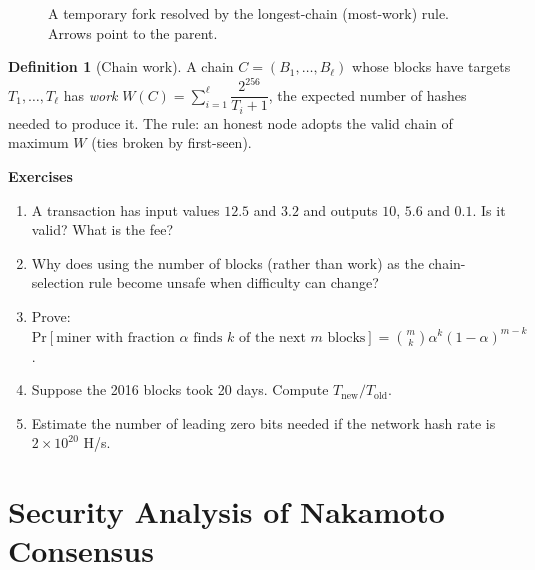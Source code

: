 \documentclass[11pt,a4paper]{article}
\newenvironment{formal}{\par\smallskip}{\par\smallskip}
\newenvironment{exercisebox}{\par\medskip\noindent\textbf{Exercises}\par\nopagebreak\smallskip}{\par\medskip}
\theoremstyle{definition}
\newtheorem{definition}{Definition}[section]
\theoremstyle{plain}
\theoremstyle{remark}
\renewcommand{\Pr}{\mathrm{Pr}}
\begin{document}
\begin{figure}[htbp]
\centering
{}
\caption{A temporary fork resolved by the longest-chain (most-work) rule. Arrows point to the parent.}
\end{figure}

\begin{formal}
\begin{definition}[Chain work]
A chain $C=(B_1,\dots,B_\ell)$ whose blocks have targets $T_1,\dots,T_\ell$ has \emph{work} $W(C)=\sum_{i=1}^\ell \dfrac{2^{256}}{T_i+1}$, the expected number of hashes needed to produce it.
The rule: an honest node adopts the valid chain of maximum $W$ (ties broken by first-seen).
\end{definition}
\end{formal}

\begin{exercisebox}
\begin{enumerate}[nosep]
\item A transaction has input values $12.5$ and $3.2$ and outputs $10$, $5.6$ and $0.1$. Is it valid? What is the fee?
\item Why does using the number of blocks (rather than work) as the chain-selection rule become unsafe when difficulty can change?
\item Prove: $\Pr[\text{miner with fraction }\alpha\text{ finds }k\text{ of the next }m\text{ blocks}]=\binom mk\alpha^k(1-\alpha)^{m-k}$.
\item Suppose the 2016 blocks took 20 days. Compute $T_{\text{new}}/T_{\text{old}}$.
\item Estimate the number of leading zero bits needed if the network hash rate is $2\times10^{20}$ H/s.
\end{enumerate}
\end{exercisebox}
\section{Security Analysis of Nakamoto Consensus}\label{sec:security}
\end{document}
